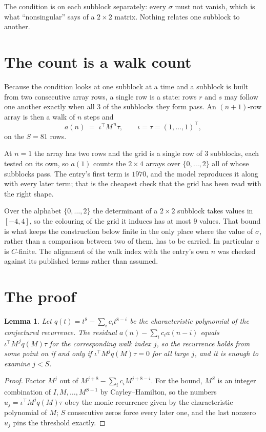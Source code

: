 \documentclass[11pt,a4paper]{article}
\theoremstyle{plain}
\newtheorem{lemma}[theorem]{Lemma}
\theoremstyle{definition}
\begin{document}
The condition is on each subblock separately: every $\sigma$ must not vanish, which is what
``nonsingular'' says of a $2\times2$ matrix. Nothing
relates one subblock to another.

\section{The count is a walk count}

Because the condition looks at one subblock at a time and a subblock is
built from two consecutive array rows, a single row is a state: rows $r$ and $s$ may follow one
another exactly when all $3$ of the subblocks they form pass. An $(n+1)$-row array is then a
walk of $n$ steps and
\[
a(n)\;=\;\iota^{\!\top}M^{\,n}\tau,\qquad\iota=\tau=(1,\dots,1)^{\!\top},
\]
on the $S=81$ rows.

At $n=1$ the array has two rows and the grid is a single row of $3$
subblocks, each tested on its own, so $a(1)$ counts the
$2\times4$ arrays over $\{0,\dots,2\}$ all of whose subblocks pass. The entry's
first term is $1970$, and the model reproduces it along with every later term; that is the
cheapest check that the grid has been read with the right shape.

Over the alphabet $\{0,\dots,2\}$ the determinant of a $2\times2$ subblock takes values in
$[-4,4]$, so the colouring of the grid it induces has at most $9$ values.
That bound is what keeps the construction below finite in the only place where the value of
$\sigma$, rather than a comparison between two of them, has to be carried.
In particular $a$ is $C$-finite. The alignment of the walk index with the entry's own $n$ was
checked against its published terms rather than assumed.

\section{The proof}

\begin{lemma}\label{lem:crit}
Let $q(t)=t^{8}-\sum_i c_it^{8-i}$ be the characteristic polynomial of the
conjectured recurrence. The residual $a(n)-\sum_ic_ia(n-i)$ equals
$\iota^{\!\top}M^{\,j}q(M)\tau$ for the corresponding walk index $j$, so the recurrence
holds from some point on if and only if $\iota^{\!\top}M^{j}q(M)\tau=0$ for all large $j$,
and it is enough to examine $j<S$.
\end{lemma}

\begin{proof}
Factor $M^{j}$ out of $M^{j+8}-\sum_ic_iM^{j+8-i}$. For the bound, $M^{S}$
is an integer combination of $I,M,\dots,M^{S-1}$ by Cayley--Hamilton, so the numbers
$u_j=\iota^{\!\top}M^{j}q(M)\tau$ obey the monic recurrence given by the characteristic
polynomial of $M$; $S$ consecutive zeros force every later one, and the last nonzero $u_j$
pins the threshold exactly.
\end{proof}
\end{document}
